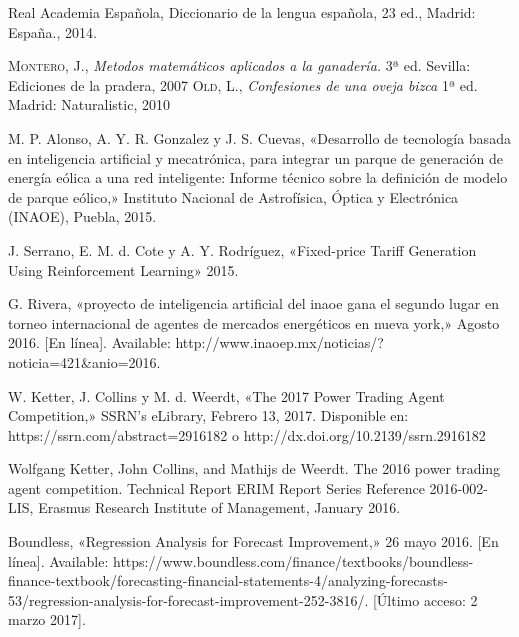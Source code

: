 \renewcommand{\refname}{Bibliografía}
\begin{thebibliography}{a}

	Real Academia Española, Diccionario de la lengua española, 23 ed., Madrid: España., 2014.
	
	 \textsc{Montero, J.}, \textit{Metodos matemáticos aplicados a la ganadería.} 3ª ed. Sevilla: Ediciones de la pradera, 2007  
	 \textsc{Old, L.}, \textit{Confesiones de una oveja bizca} 1ª ed. Madrid: Naturalistic, 2010 

	 M. P. Alonso, A. Y. R. Gonzalez y J. S. Cuevas, «Desarrollo de tecnología basada en inteligencia artificial y mecatrónica, para integrar un parque de generación de energía eólica a una red inteligente: Informe técnico sobre la definición de modelo de parque eólico,» Instituto Nacional de Astrofísica, Óptica y Electrónica (INAOE), Puebla, 2015.
	
	 J. Serrano, E. M. d. Cote y A. Y. Rodríguez, «Fixed-price Tariff Generation Using Reinforcement
Learning» 2015.

	 G. Rivera, «proyecto de inteligencia artificial del inaoe gana el segundo lugar en torneo
internacional de agentes de mercados energéticos en nueva york,» Agosto 2016. [En línea].
Available: http://www.inaoep.mx/noticias/?noticia=421\&anio=2016.

	 W. Ketter, J. Collins y M. d. Weerdt, «The 2017 Power Trading Agent Competition,» SSRN's eLibrary, Febrero 13, 2017. 
	Disponible en: https://ssrn.com/abstract=2916182 o http://dx.doi.org/10.2139/ssrn.2916182

	 Wolfgang Ketter, John Collins, and Mathijs de Weerdt. The 2016 power trading agent competition. Technical Report ERIM Report Series Reference 2016-002-LIS, Erasmus Research
Institute of Management, January 2016.

	Boundless, «Regression Analysis for Forecast Improvement,» 26 mayo 2016. [En línea].
Available: https://www.boundless.com/finance/textbooks/boundless-finance-textbook/forecasting-financial-statements-4/analyzing-forecasts-53/regression-analysis-for-forecast-improvement-252-3816/. [Último acceso: 2 marzo 2017].


\end{thebibliography}
